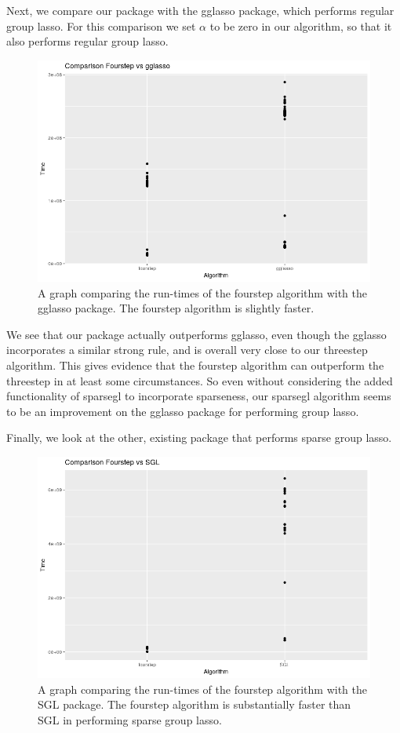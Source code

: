 \documentclass[titlepage]{article}
\begin{document}
Next, we compare our package with the gglasso package, which performs regular group lasso. For this comparison we set $\alpha$ to be zero in our algorithm, so that it also performs regular group lasso. 

\begin{figure}[tb!]
\centering
\includegraphics[scale=0.5]{fourvsgglasso.png}
\caption{A graph comparing the run-times of the fourstep algorithm with the gglasso package. The fourstep algorithm is slightly faster.}
\label{fig:1fourvsgglasso}
\end{figure}

We see that our package actually outperforms gglasso, even though the gglasso incorporates a similar strong rule, and is overall very close to our threestep algorithm. This gives evidence that the fourstep algorithm can outperform the threestep in at least some circumstances. So even without considering the added functionality of sparsegl to incorporate sparseness, our sparsegl algorithm seems to be an improvement on the gglasso package for performing group lasso.

Finally, we look at the other, existing package that performs sparse group lasso.


\begin{figure}[tb!]
\centering
\includegraphics[scale=0.5]{fourvsSGL.png}
\caption{A graph comparing the run-times of the fourstep algorithm with the SGL package. The fourstep algorithm is substantially faster than SGL in performing sparse group lasso.}
\label{fig:fourvsSGL}
\end{figure}
\end{document}
